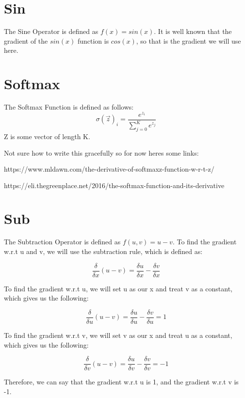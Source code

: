 \documentclass{article}
\begin{document}
\noindent\makebox[\linewidth]{\rule{\paperwidth}{0.4pt}}
    \section{Sin}
        The Sine Operator is defined as $f(x) = sin(x)$. It is well known that the gradient of the $sin(x)$ function
        is $cos(x)$, so that is the gradient we will use here.
        
\noindent\makebox[\linewidth]{\rule{\paperwidth}{0.4pt}}
    \section{Softmax}
        The Softmax Function is defined as follows:
        $$\sigma(\vec z)_i = \frac{e^{z_i}}{\sum_{j=0}^{K} e^{z_j}}$$
        Z is some vector of length K. 

        Not sure how to write this gracefully so for now heres some links:

        https://www.mldawn.com/the-derivative-of-softmaxz-function-w-r-t-z/
        
        https://eli.thegreenplace.net/2016/the-softmax-function-and-its-derivative

\noindent\makebox[\linewidth]{\rule{\paperwidth}{0.4pt}}  
    \section{Sub}
        The Subtraction Operator is defined as $f(u,v) = u - v$. To find the gradient w.r.t u and v, 
        we will use the subtraction rule, which is defined as: 
    
        $$\frac{\delta}{\delta{x}}(u - v) = \frac{\delta{u}}{\delta{x}} - \frac{\delta{v}}{\delta{x}}$$
    
        To find the gradient w.r.t u, we will set u as our x and treat v as a constant, 
        which gives us the following:
    
        $$\frac{\delta}{\delta{u}}(u - v) = \frac{\delta{u}}{\delta{u}} - \frac{\delta{v}}{\delta{u}} = 1$$
    
        To find the gradient w.r.t v, we will set v as our x and treat u as a constant, 
        which gives us the following:
    
        $$\frac{\delta}{\delta{v}}(u - v) = \frac{\delta{u}}{\delta{v}} - \frac{\delta{v}}{\delta{v}} = -1$$
    
        Therefore, we can say that the gradient w.r.t u is 1, and the gradient w.r.t v is -1. 
\end{document}
